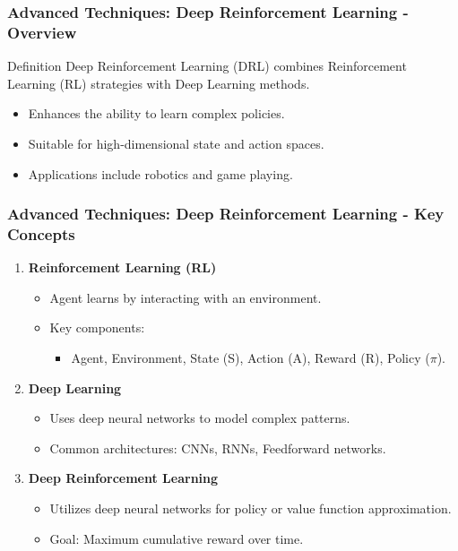 \documentclass[aspectratio=169]{beamer}
\begin{document}
\begin{frame}[fragile]
    \frametitle{Advanced Techniques: Deep Reinforcement Learning - Overview}
    \begin{block}{Definition}
        Deep Reinforcement Learning (DRL) combines Reinforcement Learning (RL) strategies with Deep Learning methods.
    \end{block}
    \begin{itemize}
        \item Enhances the ability to learn complex policies.
        \item Suitable for high-dimensional state and action spaces.
        \item Applications include robotics and game playing.
    \end{itemize}
\end{frame}

\begin{frame}[fragile]
    \frametitle{Advanced Techniques: Deep Reinforcement Learning - Key Concepts}
    \begin{enumerate}
        \item \textbf{Reinforcement Learning (RL)}
        \begin{itemize}
            \item Agent learns by interacting with an environment.
            \item Key components:
            \begin{itemize}
                \item Agent, Environment, State (S), Action (A), Reward (R), Policy ($\pi$).
            \end{itemize}
        \end{itemize}
        \item \textbf{Deep Learning}
        \begin{itemize}
            \item Uses deep neural networks to model complex patterns.
            \item Common architectures: CNNs, RNNs, Feedforward networks.
        \end{itemize}
        \item \textbf{Deep Reinforcement Learning}
        \begin{itemize}
            \item Utilizes deep neural networks for policy or value function approximation.
            \item Goal: Maximum cumulative reward over time.
        \end{itemize}
    \end{enumerate}
\end{frame}
\end{document}
